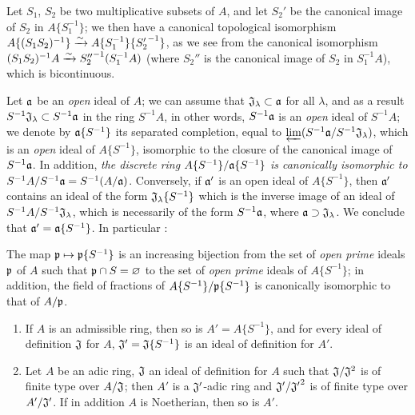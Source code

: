 \begin{env}[7.6.8]
\label{0.7.6.8}
Let $S_1$, $S_2$ be two multiplicative subsets of $A$, and let $S_2'$ be the canonical image of
$S_2$ in $A\{S_1^{-1}\}$; we then have a canonical topological isomorphism
$A\{(S_1 S_2)^{-1}\}\xrightarrow{\sim} A\{S_1^{-1}\}\{{S_2'}^{-1}\}$, as we see from the canonical isomorphism
$(S_1 S_2)^{-1}A\xrightarrow{\sim}{S_2''}^{-1}(S_1^{-1}A)$ (where $S_2''$ is the canonical image of $S_2$ in
$S_1^{-1}A$), which is bicontinuous.
\end{env}

\begin{env}[7.6.9]
\label{0.7.6.9}
Let $\mathfrak{a}$ be an {\em open} ideal of $A$; we can assume that
$\mathfrak{J}_\lambda\subset\mathfrak{a}$ for all $\lambda$, and as a result
$S^{-1}\mathfrak{J}_\lambda\subset S^{-1}\mathfrak{a}$ in the ring $S^{-1}A$, in other words,
$S^{-1}\mathfrak{a}$ is an {\em open} ideal of $S^{-1}A$; we denote by $\mathfrak{a}\{S^{-1}\}$ its
separated completion, equal to $\varprojlim(S^{-1}\mathfrak{a}/S^{-1}\mathfrak{J}_\lambda)$, which is
an {\em open} ideal of $A\{S^{-1}\}$, isomorphic to the closure of the canonical image of
$S^{-1}\mathfrak{a}$. In addition, {\em the discrete ring $A\{S^{-1}\}/\mathfrak{a}\{S^{-1}\}$ is
canonically isomorphic to $S^{-1}A/S^{-1}\mathfrak{a}=S^{-1}(A/\mathfrak{a})$}. Conversely, if
$\mathfrak{a}'$ is an open ideal of $A\{S^{-1}\}$, then $\mathfrak{a}'$ contains an ideal of the
form $\mathfrak{J}_\lambda\{S^{-1}\}$ which is the inverse image of an ideal of
$S^{-1}A/S^{-1}\mathfrak{J}_\lambda$, which is necessarily  of the
form $S^{-1}\mathfrak{a}$, where $\mathfrak{a}\supset\mathfrak{J}_\lambda$. We conclude that
$\mathfrak{a}'=\mathfrak{a}\{S^{-1}\}$. In particular :
\end{env}

\begin{prop}[7.6.10]
\label{0.7.6.10}
The map $\mathfrak{p}\mapsto\mathfrak{p}\{S^{-1}\}$ is an increasing bijection from the set of
{\em open prime} ideals $\mathfrak{p}$ of $A$ such that $\mathfrak{p}\cap S=\varnothing$ to the set
of {\em open prime} ideals
of $A\{S^{-1}\}$; in addition, the field of fractions of $A\{S^{-1}\}/\mathfrak{p}\{S^{-1}\}$ is
canonically isomorphic to that of $A/\mathfrak{p}$.
\end{prop}

\begin{prop}[7.6.11]
\label{0.7.6.11}
\medskip\noindent
\begin{enumerate}[label={\rm(\roman*)}]
  \item If $A$ is an admissible ring, then so is $A'=A\{S^{-1}\}$, and for every ideal
    of definition $\mathfrak{J}$ for $A$, $\mathfrak{J}'=\mathfrak{J}\{S^{-1}\}$ is an ideal of
    definition for $A'$.
  \item Let $A$ be an adic ring, $\mathfrak{J}$ an ideal of definition for $A$ such that
    $\mathfrak{J}/\mathfrak{J}^2$ is of finite type over $A/\mathfrak{J}$; then $A'$ is a
    $\mathfrak{J}'$-adic ring and $\mathfrak{J}'/{\mathfrak{J}'}^2$ is of finite type over
    $A'/\mathfrak{J}'$. If in addition $A$ is Noetherian, then so is $A'$.
\end{enumerate}
\end{prop}

